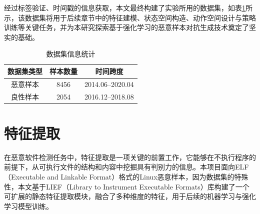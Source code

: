 
经过标签验证、时间戳的信息获取，本文最终构建了实验所用的数据集，如表\ref{tab:5.2}所示，该数据集将用于后续章节中的特征建模、状态空间构造、动作空间设计与策略训练等关键任务，并为本研究探索基于强化学习的恶意样本对抗生成技术奠定了坚实的基础。


\begin{table}[htbp]
	\centering
	\caption{数据集信息统计}
	\label{tab:5.2}
	\begin{tabular*}{0.9\textwidth}{@{\extracolsep{\fill}}ccc}
		\toprule
		数据集类型 & 样本数量 & 时间跨度 \\
		\midrule
		恶意样本 & 8456 & 2014.06--2020.04 \\
		良性样本 & 2054 & 2016.12--2018.08 \\
		\bottomrule
	\end{tabular*}
\end{table}

\section{特征提取}

在恶意软件检测任务中，特征提取是一项关键的前置工作，它能够在不执行程序的前提下，从可执行文件的结构和内容中挖掘具有判别力的信息。本项目面向ELF（Executable and Linkable Format）格式的Linux恶意样本，因为数据集的特殊性，本文基于LIEF（Library to Instrument Executable Formats）库构建了一个可扩展的静态特征提取模块，融合了多种维度的特征，用于后续的机器学习与强化学习模型训练。

